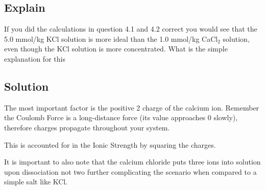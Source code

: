 \documentclass{article}
\begin{document}
\subsection{Explain}
If you did the calculations in question 4.1 and 4.2 correct you would see that the 5.0 mmol/kg KCl solution is more ideal than the 1.0 mmol/kg CaCl$_2$ solution, even though the KCl solution is more concentrated.  
What is the simple explanation for this

\subsection*{Solution}
The most important factor is the positive 2 charge of the calcium ion. 
Remember the Coulomb Force is a long-distance force (its value approaches 0 slowly), therefore charges propagate throughout your system.

This is accounted for in the Ionic Strength by squaring the charges. 

It is important to also note that the calcium chloride puts three ions into solution upon dissociation not two further complicating the scenario when compared to a simple salt like KCl. 
\end{document}
